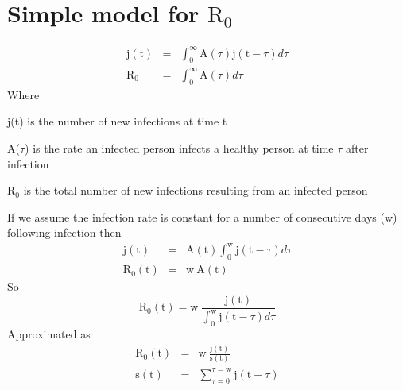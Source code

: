 \documentclass[a4paper,12pt]{article}
\newenvironment{packed_enum}{
\begin{itemize}
  \setlength{\topsep}{0pt}
  \setlength{\itemsep}{0pt}
  \setlength{\parskip}{0pt}
  \setlength{\parsep}{0pt}
  \setlength{\partopsep}{0pt}
}{\end{itemize}}
\begin{document}
\section*{Simple model for $\textrm{R}_{0}$}
\begin{eqnarray*}
\textrm{j}(\textrm{t})&=&\int_{0}^{\infty}\textrm{A}(\tau)\textrm{j}(\textrm{t}-\tau)d\tau \\
\textrm{R}_{0}&=&\int_{0}^{\infty}\textrm{A}(\tau)d\tau
\end{eqnarray*}
Where
\begin{packed_enum}
\item j(t) is the number of new infections at time t
\item A($\tau$) is the rate an infected person infects a healthy person at time $\tau$ after infection
\item $\textrm{R}_{0}$ is the total number of new infections resulting from an infected person
\end{packed_enum}
If we assume the infection rate is constant for a number of consecutive days (w) following infection then
\begin{eqnarray*}
\textrm{j}(\textrm{t})&=&\textrm{A}(\textrm{t})\int_{0}^{\textrm{w}}\textrm{j}(\textrm{t}-\tau)d\tau \\
\textrm{R}_{0}(\textrm{t})&=&\textrm{w}\:\textrm{A}(\textrm{t})
\end{eqnarray*}
So
\begin{equation*}
\textrm{R}_{0}(\textrm{t})=\textrm{w}\:\frac{\textrm{j}(\textrm{t})}{\int_{0}^{\textrm{w}}\textrm{j}(\textrm{t}-\tau)d\tau}
\end{equation*}
Approximated as
\begin{eqnarray*}
\textrm{R}_{0}(\textrm{t})&=&\textrm{w}\:\frac{\textrm{j}(\textrm{t})}{\textrm{s}(\textrm{t})} \\
\textrm{s}(\textrm{t})&=&\sum_{\tau=0}^{\tau=\textrm{w}}\textrm{j}(\textrm{t}-\tau)
\end{eqnarray*}
\end{document}
